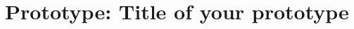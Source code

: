 \documentclass[Main]{subfiles}
\begin{document}
\chapter{Prototype: Title of your prototype}
\end{document}
